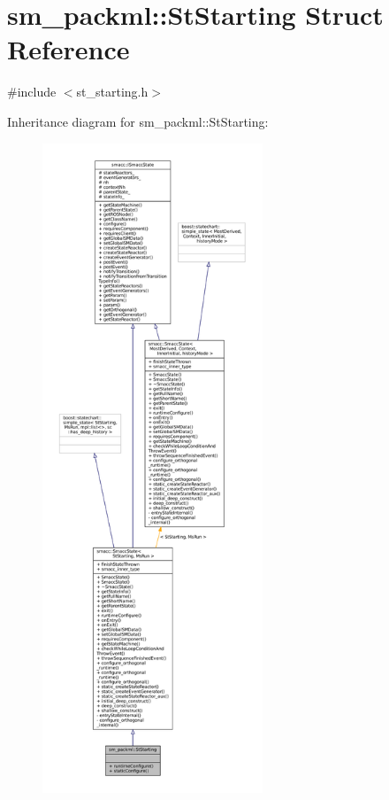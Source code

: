 \hypertarget{structsm__packml_1_1StStarting}{}\section{sm\+\_\+packml\+:\+:St\+Starting Struct Reference}
\label{structsm__packml_1_1StStarting}


{\ttfamily \#include $<$st\+\_\+starting.\+h$>$}



Inheritance diagram for sm\+\_\+packml\+:\+:St\+Starting\+:
\nopagebreak
\begin{figure}[H]
\begin{center}
\leavevmode
\includegraphics[height=550pt]{structsm__packml_1_1StStarting__inherit__graph}
\end{center}
\end{figure}


